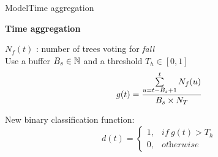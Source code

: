 \begin{frame}{Model}{Time aggregation}
\begin{minipage}[t]{0.7\linewidth}
\end{minipage}

    \pause
    \medskip
    \centering\textbf{Time aggregation}
    
    \raggedright
    
    \centering
    \begin{minipage}[t]{0.42\linewidth}
        \vspace{0pt}
        $N_f(t)$ : number of trees voting for \emph{fall}\\
        Use a buffer $B_s \in \mathbb{N}$ and a threshold $T_h \in [0, 1]$
        \begin{equation*}
        g(t) = \frac{\sum\limits_{u=t-B_{s}+1}^{t}N_{f}(u)}{B_{s}\times N_{T}}\\
        \end{equation*}
    \end{minipage}\hspace{0.2cm}
    \begin{minipage}[t]{0.42\linewidth}
        \vspace{0pt}
        New binary classification function:
        \begin{equation*}
        d(t) = 
        \begin{cases}
        1, & \textit{if}\ g(t) > T_{h} \\
        0, & \textit{otherwise}
        \end{cases}
        \end{equation*}
    \end{minipage}

\end{frame}

